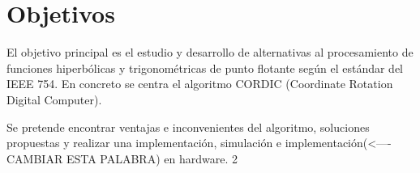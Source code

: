 
\chapter{Objetivos}
\label{objetivos}

El objetivo principal es el estudio y desarrollo de alternativas al procesamiento de funciones hiperbólicas y trigonométricas de punto flotante según el estándar del IEEE 754. En concreto se centra el algoritmo CORDIC (Coordinate Rotation Digital Computer).

Se pretende encontrar ventajas e inconvenientes del algoritmo, soluciones propuestas y realizar una implementación, simulación e implementación(<----CAMBIAR ESTA PALABRA) en hardware.
2



